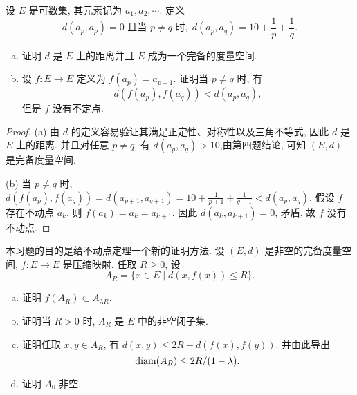 \begin{exercise}
    设 $E$ 是可数集, 其元素记为 $a_1,a_2,\cdots$. 定义
    \[d(a_p,a_p)=0\text{\ 且当\ }p\neq q\text{\ 时},\; d(a_p,a_q)=10+\frac{1}{p}+\frac{1}{q}.\]
    \begin{enumerate}[(a)]
      \item 证明 $d$ 是 $E$ 上的距离并且 $E$ 成为一个完备的度量空间.
      \item 设 $f:E\to E$ 定义为 $f(a_p)=a_{p+1}$. 证明当 $p\neq q$ 时, 有
        \[d(f(a_p),f(a_q))<d(a_p,a_q),\]
        但是 $f$ 没有不定点.
    \end{enumerate}
\end{exercise}

\begin{proof}
    (a) 由 $d$ 的定义容易验证其满足正定性、对称性以及三角不等式, 因此 $d$ 是 $E$ 上的距离.
    并且对任意 $p\neq q$, 有 $d(a_p,a_q)>10$,由第四题结论, 可知 $(E,d)$ 是完备度量空间.

    (b) 当 $p\neq q$ 时, $d(f(a_p),f(a_q))=d(a_{p+1},a_{q+1})=10+\frac{1}{p+1}+\frac{1}{q+1}<d(a_p,a_q)$.
    假设 $f$ 存在不动点 $a_k$, 则 $f(a_k)=a_k=a_{k+1}$,
    因此 $d(a_k,a_{k+1})=0$, 矛盾, 故 $f$ 没有不动点.
\end{proof}



\begin{exercise}
    本习题的目的是给不动点定理一个新的证明方法.
    设 $(E,d)$ 是非空的完备度量空间, $f:E\to E$ 是压缩映射. 任取 $R\geq 0$, 设
    \[A_R=\{x\in E\mid d(x,f(x))\leq R\}.\]
    \begin{enumerate}[(a)]
        \item 证明 $f(A_R)\subset A_{\lambda R}$.
        \item 证明当 $R>0$ 时, $A_R$ 是 $E$ 中的非空闭子集.
        \item 证明任取 $x,y\in A_R$, 有 $d(x,y)\leq 2R+d(f(x),f(y))$. 并由此导出
              \[\operatorname{diam}(A_R)\leq 2R/(1-\lambda).\]
        \item 证明 $A_0$ 非空.
    \end{enumerate}
\end{exercise}

